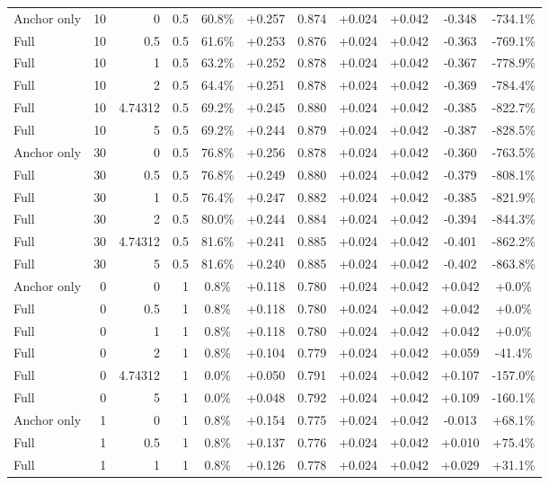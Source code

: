 \begin{table}[htbp]
\begin{tabular}{lrrrccccccc}
Anchor only & 10 & 0 & 0.5 & 60.8\% & +0.257 & 0.874 & +0.024 & +0.042 & -0.348 & -734.1\% \\
Full & 10 & 0.5 & 0.5 & 61.6\% & +0.253 & 0.876 & +0.024 & +0.042 & -0.363 & -769.1\% \\
Full & 10 & 1 & 0.5 & 63.2\% & +0.252 & 0.878 & +0.024 & +0.042 & -0.367 & -778.9\% \\
Full & 10 & 2 & 0.5 & 64.4\% & +0.251 & 0.878 & +0.024 & +0.042 & -0.369 & -784.4\% \\
Full & 10 & 4.74312 & 0.5 & 69.2\% & +0.245 & 0.880 & +0.024 & +0.042 & -0.385 & -822.7\% \\
Full & 10 & 5 & 0.5 & 69.2\% & +0.244 & 0.879 & +0.024 & +0.042 & -0.387 & -828.5\% \\
Anchor only & 30 & 0 & 0.5 & 76.8\% & +0.256 & 0.878 & +0.024 & +0.042 & -0.360 & -763.5\% \\
Full & 30 & 0.5 & 0.5 & 76.8\% & +0.249 & 0.880 & +0.024 & +0.042 & -0.379 & -808.1\% \\
Full & 30 & 1 & 0.5 & 76.4\% & +0.247 & 0.882 & +0.024 & +0.042 & -0.385 & -821.9\% \\
Full & 30 & 2 & 0.5 & 80.0\% & +0.244 & 0.884 & +0.024 & +0.042 & -0.394 & -844.3\% \\
Full & 30 & 4.74312 & 0.5 & 81.6\% & +0.241 & 0.885 & +0.024 & +0.042 & -0.401 & -862.2\% \\
Full & 30 & 5 & 0.5 & 81.6\% & +0.240 & 0.885 & +0.024 & +0.042 & -0.402 & -863.8\% \\
Anchor only & 0 & 0 & 1 & 0.8\% & +0.118 & 0.780 & +0.024 & +0.042 & +0.042 & +0.0\% \\
Full & 0 & 0.5 & 1 & 0.8\% & +0.118 & 0.780 & +0.024 & +0.042 & +0.042 & +0.0\% \\
Full & 0 & 1 & 1 & 0.8\% & +0.118 & 0.780 & +0.024 & +0.042 & +0.042 & +0.0\% \\
Full & 0 & 2 & 1 & 0.8\% & +0.104 & 0.779 & +0.024 & +0.042 & +0.059 & -41.4\% \\
Full & 0 & 4.74312 & 1 & 0.0\% & +0.050 & 0.791 & +0.024 & +0.042 & +0.107 & -157.0\% \\
Full & 0 & 5 & 1 & 0.0\% & +0.048 & 0.792 & +0.024 & +0.042 & +0.109 & -160.1\% \\
Anchor only & 1 & 0 & 1 & 0.8\% & +0.154 & 0.775 & +0.024 & +0.042 & -0.013 & +68.1\% \\
Full & 1 & 0.5 & 1 & 0.8\% & +0.137 & 0.776 & +0.024 & +0.042 & +0.010 & +75.4\% \\
Full & 1 & 1 & 1 & 0.8\% & +0.126 & 0.778 & +0.024 & +0.042 & +0.029 & +31.1\% \\

\end{tabular}
\end{table}
